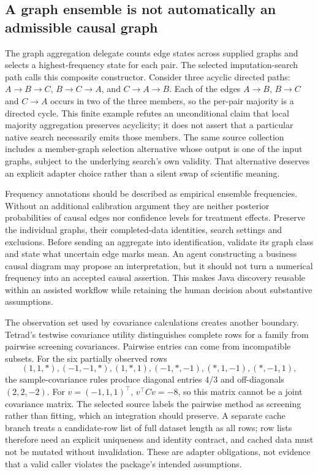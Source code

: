 \subsection*{A graph ensemble is not automatically an admissible causal graph}
The graph aggregation delegate counts edge states across supplied graphs and selects a highest-frequency state for each pair. The selected imputation-search path calls this composite constructor. Consider three acyclic directed paths: $A\to B\to C$, $B\to C\to A$, and $C\to A\to B$. Each of the edges $A\to B$, $B\to C$ and $C\to A$ occurs in two of the three members, so the per-pair majority is a directed cycle. This finite example refutes an unconditional claim that local majority aggregation preserves acyclicity; it does not assert that a particular native search necessarily emits those members. The same source collection includes a member-graph selection alternative whose output is one of the input graphs, subject to the underlying search's own validity. That alternative deserves an explicit adapter choice rather than a silent swap of scientific meaning.~\citep{exec25_jtm_tetrad,exec25_jtm_choice}

Frequency annotations should be described as empirical ensemble frequencies. Without an additional calibration argument they are neither posterior probabilities of causal edges nor confidence levels for treatment effects. Preserve the individual graphs, their completed-data identities, search settings and exclusions. Before sending an aggregate into identification, validate its graph class and state what uncertain edge marks mean. An agent constructing a business causal diagram may propose an interpretation, but it should not turn a numerical frequency into an accepted causal assertion. This makes Java discovery reusable within an assisted workflow while retaining the human decision about substantive assumptions.~\citep{exec25_jtm_tetrad,exec25_jtm_choice}

The observation set used by covariance calculations creates another boundary. Tetrad's testwise covariance utility distinguishes complete rows for a family from pairwise screening covariances. Pairwise entries can come from incompatible subsets. For the six partially observed rows
\[
 (1,1,*),(-1,-1,*),(1,*,1),(-1,*,-1),(*,1,-1),(*,-1,1),
\]
the sample-covariance rules produce diagonal entries $4/3$ and off-diagonals $(2,2,-2)$. For $v=(-1,1,1)^\top$, $v^\top C v=-8$, so this matrix cannot be a joint covariance matrix. The selected source labels the pairwise method as screening rather than fitting, which an integration should preserve. A separate cache branch treats a candidate-row list of full dataset length as all rows; row lists therefore need an explicit uniqueness and identity contract, and cached data must not be mutated without invalidation. These are adapter obligations, not evidence that a valid caller violates the package's intended assumptions.~\citep{exec25_jtm_tetrad,exec25_jtm_choice}

